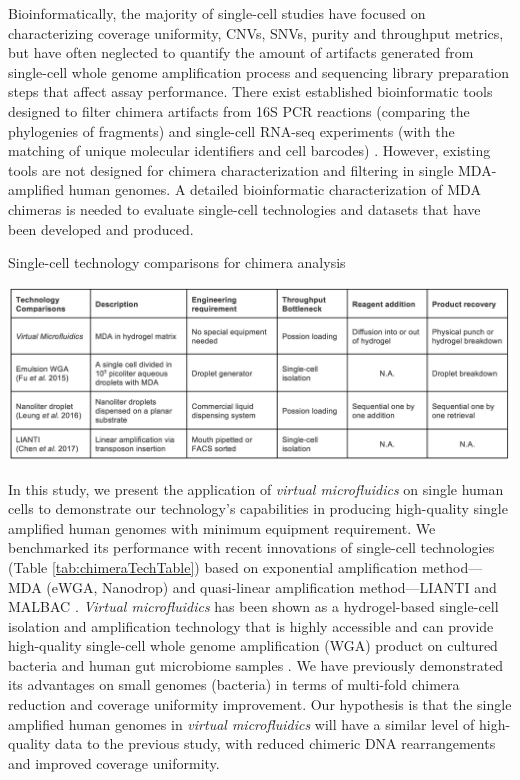 Bioinformatically, the majority of single-cell studies have focused on characterizing coverage uniformity, CNVs, SNVs, purity and throughput metrics, but have often neglected to quantify the amount of artifacts generated from single-cell whole genome amplification process and sequencing library preparation steps that affect assay performance. There exist established bioinformatic tools designed to filter chimera artifacts from 16S PCR reactions (comparing the phylogenies of fragments) \cite{Edgar:2011gy, Haas:2011jg} and single-cell RNA-seq experiments (with the matching of unique molecular identifiers and cell barcodes) \cite{Dixit:2016ki}. However, existing tools are not designed for chimera characterization and filtering in single MDA-amplified human genomes. A detailed bioinformatic characterization of MDA chimeras is needed to evaluate single-cell technologies and datasets that have been developed and produced. 

\begin{table}
\caption{Single-cell technology comparisons for chimera analysis}
\label{tab:chimeraTechTable}
\includegraphics[width=\linewidth]{./figures/Chimera_TechTable}
\end{table}

In this study, we present the application of \textit{virtual microfluidics} on single human cells to demonstrate our technology's capabilities in producing high-quality single amplified human genomes with minimum equipment requirement. We benchmarked its performance with recent innovations of single-cell technologies (Table \ref{tab:chimeraTechTable}) based on exponential amplification method---MDA (eWGA, Nanodrop) and quasi-linear amplification method---LIANTI and MALBAC \cite{ Zong:2012bs,Fu:2015gl,Leung:2016vx,Chen:2017hq}. \textit{Virtual microfluidics} has been shown as a hydrogel-based single-cell isolation and amplification technology that is highly accessible and can provide high-quality single-cell whole genome amplification (WGA) product on cultured bacteria and human gut microbiome samples \cite{Xu:2016wt}. We have previously demonstrated its advantages on small genomes (bacteria) in terms of multi-fold chimera reduction and coverage uniformity improvement. Our hypothesis is that the single amplified human genomes in \textit{virtual microfluidics} will have a similar level of high-quality data to the previous study, with reduced chimeric DNA rearrangements and improved coverage uniformity. 

